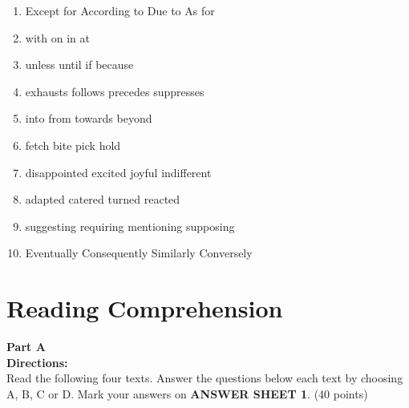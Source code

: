 \begin{enumerate}
\item


\fourchoices
{Except for}
{According to}
{Due to}
{As for}




\item


\fourchoices
{with}
{on}
{in}
{at}




\item


\fourchoices
{unless}
{until}
{if}
{because}




\item


\fourchoices
{exhausts}
{follows}
{precedes}
{suppresses}




\item


\fourchoices
{into}
{from}
{towards}
{beyond}




\item

	
\fourchoices
{fetch}
{bite}
{pick}
{hold}




\item

\fourchoices
{disappointed}
{excited}
{joyful}
{indifferent}




\item


\fourchoices
{adapted}
{catered}
{turned}
{reacted}




\item

\fourchoices
{suggesting}
{requiring}
{mentioning}
{supposing}




\item

\fourchoices
{Eventually}
{Consequently}
{Similarly}
{Conversely}

\end{enumerate}


\vfil


\section{Reading Comprehension}


\noindent
\textbf{Part A}\\
\textbf{Directions:}\\
Read the following four texts. Answer the questions below each
	text by choosing A, B, C or
	D. Mark your answers on \textbf{ANSWER SHEET 1}. (40
	points)

